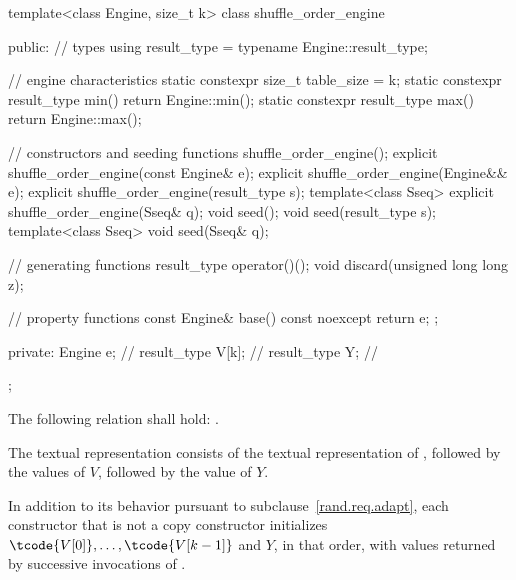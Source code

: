 %
%
\begin{codeblock}
template<class Engine, size_t k>
  class shuffle_order_engine {
  public:
    // types
    using result_type = typename Engine::result_type;

    // engine characteristics
    static constexpr size_t table_size = k;
    static constexpr result_type min() { return Engine::min(); }
    static constexpr result_type max() { return Engine::max(); }

    // constructors and seeding functions
    shuffle_order_engine();
    explicit shuffle_order_engine(const Engine& e);
    explicit shuffle_order_engine(Engine&& e);
    explicit shuffle_order_engine(result_type s);
    template<class Sseq> explicit shuffle_order_engine(Sseq& q);
    void seed();
    void seed(result_type s);
    template<class Sseq> void seed(Sseq& q);

    // generating functions
    result_type operator()();
    void discard(unsigned long long z);

    // property functions
    const Engine& base() const noexcept { return e; };

  private:
    Engine e;           // \expos
    result_type V[k];   // \expos
    result_type Y;      // \expos
  };
\end{codeblock}

\pnum
The following relation shall hold:
  .

\pnum
The textual representation%
%
consists of
 the textual representation of ,
followed by
 the  values of $V$,
followed by
 the value of $Y$.

\pnum
In addition to its behavior
pursuant to subclause~\ref{rand.req.adapt},
each constructor%
that is not a copy constructor
initializes $\tcode{V[0]}, \dotsc, \tcode{V[k-1]}$ and $Y$,
in that order,
with values returned by successive invocations of .%




